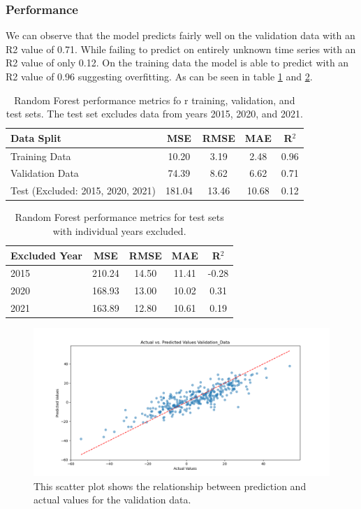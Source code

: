 \documentclass{article}
\begin{document}
\subsubsection{Performance}
We can observe that the model predicts fairly well on the validation data with an R2 value of 0.71. While failing to predict on entirely unknown time series with an R2 value of only 0.12.
On the training data the model is able to predict with an R2 value of 0.96 suggesting overfitting.
As can be seen in table \ref{table:errors_on_datasets_variant_1} and \ref{table:errors_on_datasets_years_variant_1}.
\begin{table}[H]
	\centering
	\begin{tabular}{lcccc}
		\hline
		Data Split                        & MSE    & RMSE  & MAE   & R$^2$ \\
		\hline
		Training Data                     & 10.20  & 3.19  & 2.48  & 0.96  \\
		Validation Data                   & 74.39  & 8.62  & 6.62  & 0.71  \\
		Test (Excluded: 2015, 2020, 2021) & 181.04 & 13.46 & 10.68 & 0.12  \\
		\hline
	\end{tabular}
	\caption{\label{table:errors_on_datasets_variant_1} Random Forest performance metrics fo r training, validation, and test sets. The test set excludes data from years 2015, 2020, and 2021.}
\end{table}
\begin{table}[H]
	\centering
	\begin{tabular}{lcccc}
		\hline
		Excluded Year & MSE    & RMSE  & MAE   & R$^2$ \\
		\hline
		2015          & 210.24 & 14.50 & 11.41 & -0.28 \\
		2020          & 168.93 & 13.00 & 10.02 & 0.31  \\
		2021          & 163.89 & 12.80 & 10.61 & 0.19  \\
		\hline
	\end{tabular}
	\caption{\label{table:errors_on_datasets_years_variant_1} Random Forest performance metrics for test sets with individual years excluded.}
\end{table}
\begin{figure}[H]
	\centering
	\includegraphics[width=1.0\textwidth]{./plots/scatter_Validation_Data.png}
	\caption{\label{fig:month_value_combination_scatter_validation_data}This scatter plot shows the relationship between prediction and actual values for the validation data.}
\end{figure}
\end{document}
